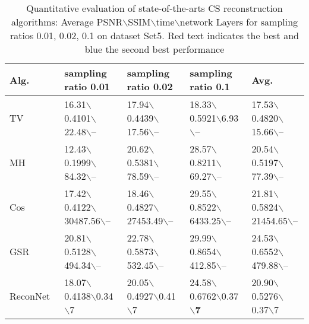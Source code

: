 \documentclass{article}
\begin{document}
\begin{table*}[!t]
\centering

    \caption{Quantitative evaluation of state-of-the-arts CS reconstruction algorithms: Average PSNR$\backslash$SSIM$\backslash$time$\backslash$network Layers for sampling ratios 0.01, 0.02, 0.1 on dataset Set5. {\color{red}Red} text indicates the best and {\color{blue}blue} the second best performance}     \label{tab:results1}
    \renewcommand\arraystretch{1.10}
    \begin{small}
    \begin{tabular}{>{\hfil}p{55pt}<{\hfil}|>{\hfil}p{98pt}<{\hfil}|>{\hfil}p{98pt}<{\hfil}|
    >{\hfil}p{98pt}<{\hfil}|>{\hfil}p{98pt}<{\hfil}}

\hline
{ Alg.} & {  sampling ratio 0.01} & {sampling ratio 0.02} & { sampling ratio 0.1} & {Avg.}      \\
    \hline
    TV~\cite{li1tval3}           & 16.31$\backslash$0.4101$\backslash$22.48$\backslash$--    & 17.94$\backslash$0.4439$\backslash$17.56$\backslash$--	& 18.33$\backslash$0.5921$\backslash$6.93$\backslash$--	&  17.53$\backslash$0.4820$\backslash$15.66$\backslash$--        \\

MH~\cite{chen2011compressed}             & 12.43$\backslash$0.1999$\backslash$84.32$\backslash$--	&   20.62$\backslash$0.5381$\backslash$78.59$\backslash$--  & 28.57$\backslash$0.8211$\backslash$69.27$\backslash$--	&  20.54$\backslash$0.5197$\backslash$77.39$\backslash$--        \\

Cos~\cite{zhang2012compressed}            & 17.42$\backslash$0.4122$\backslash$30487.56$\backslash$-- 	&	18.46$\backslash$0.4827$\backslash$27453.49$\backslash$--	& 29.55$\backslash$0.8522$\backslash$6433.25$\backslash$--    &  21.81$\backslash$0.5824$\backslash$21454.65$\backslash$--     \\

GSR~\cite{zhang2014group}            &  20.81$\backslash$0.5128$\backslash$494.34$\backslash$-- 	&	22.78$\backslash$0.5873$\backslash$532.45$\backslash$--	& 29.99$\backslash$0.8654$\backslash$412.85$\backslash$--	&  24.53$\backslash$0.6552$\backslash$479.88$\backslash$--     \\
ReconNet~\cite{kulkarni2016reconnet}         & 18.07$\backslash$0.4138$\backslash$0.34$\backslash$7	&	20.05$\backslash$0.4927$\backslash$0.41$\backslash$7	& 24.58$\backslash$0.6762$\backslash$0.37$\backslash$\textbf{\color{blue}7}	&  20.90$\backslash$0.5276$\backslash$0.37$\backslash$7     \\


\end{tabular}
\end{small}
\end{table*}
\end{document}
